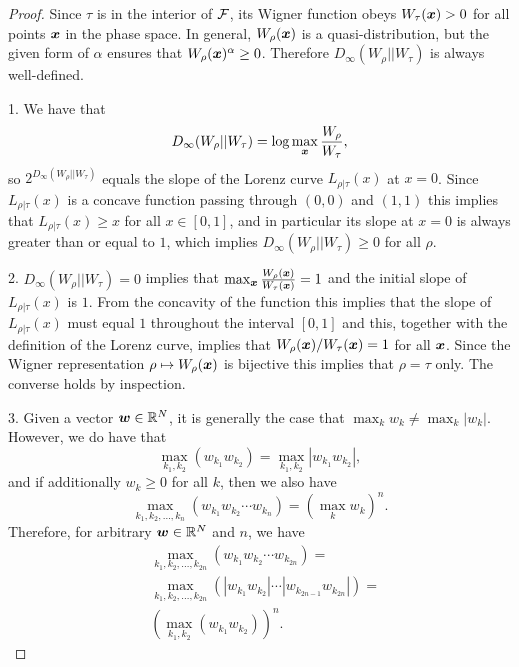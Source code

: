 \documentclass[pra,
aps,
twocolumn,
superscriptaddress,
groupedaddress,
nofootinbib,
reprint
]{revtex4-1}
\begin{document}
\begin{proof}
	Since $\tau$ is in the interior of ${\mathcal F}$, its Wigner function obeys $W_\tau(\boldsymbol{x}) >0$ for all points $\boldsymbol{x}$ in the phase space. 
In general, $W_\rho(\boldsymbol{x})$ is a quasi-distribution, but the given form of $\alpha$ ensures that $W_{\rho}(\bm{x})^\alpha \geq 0$. 
Therefore $D_\infty (W_\rho || W_\tau)$ is always well-defined.

1. We have that 
\begin{equation}
	D_\infty(W_\rho || W_\tau) =\log  \max_{\boldsymbol{x}} \frac{W_\rho}{W_\tau},
\end{equation}
so $2^{D_\infty(W_\rho || W_\tau)}$ equals the slope of the Lorenz curve $L_{\rho|\tau}(x)$ at $x=0$. Since $L_{\rho|\tau}(x)$ is a concave function passing through $(0,0)$ and $(1,1)$ this implies that $L_{\rho |\tau}(x) \ge x$ for all $x \in [0,1]$, and in particular its slope at $x=0$ is always greater than or equal to $1$, which implies $D_\infty(W_\rho || W_\tau) \geq 0$ for all $\rho$.

2. $D_\infty(W_\rho || W_\tau) = 0$ implies that $\max_{\boldsymbol{x}} \frac{W_\rho(\boldsymbol{x})}{W_\tau(\boldsymbol{x})}=1$ and the initial slope of $L_{\rho|\tau}(x)$ is $1$. From the concavity of the function this implies that the slope of $L_{\rho|\tau}(x)$ must equal $1$ throughout the interval $[0,1]$ and this, together with the definition of the Lorenz curve, implies that $W_\rho(\boldsymbol{x})/W_\tau(\boldsymbol{x}) = 1$ for all $\boldsymbol{x}$. Since the Wigner representation $\rho \mapsto W_\rho(\boldsymbol{x})$ is bijective this implies that $\rho = \tau$ only. The converse holds by inspection.

3. Given a vector $\boldsymbol{w} \in \mathbb{R}^N$, it is generally the case that $\max_k w_k \ne \max_k |w_k|$. 
However, we do have that
\begin{equation}
	\max_{k_1,k_2} (w_{k_1} w_{k_2}) = \max_{k_1,k_2} |w_{k_1} w_{k_2}|,
\end{equation}
and if additionally $w_k \geq 0$ for all $k$, then we also have
\begin{equation}
	\max_{k_1, k_2, \dots, k_n} \left( w_{k_1}w_{k_2}\cdots w_{k_n} \right) = (\max_k w_k)^n.
\end{equation}
Therefore, for arbitrary $\boldsymbol{w} \in \mathbb{R}^N$ and $n$, we have
\begin{align}
	&\max_{k_1, k_2, \dots, k_{2n}}\left( w_{k_1}w_{k_2}\cdots w_{k_{2n}} \right) = \nonumber\\
	&\max_{k_1, k_2, \dots, k_{2n}}\left( |w_{k_1}w_{k_2}|\cdots |w_{k_{2n-1}}w_{k_{2n}}| \right) = \nonumber \\
	&\left( \max_{k_1 ,k_2}\left( w_{k_1} w_{k_2} \right) \right)^n.
\end{align}


\end{proof}
\end{document}
